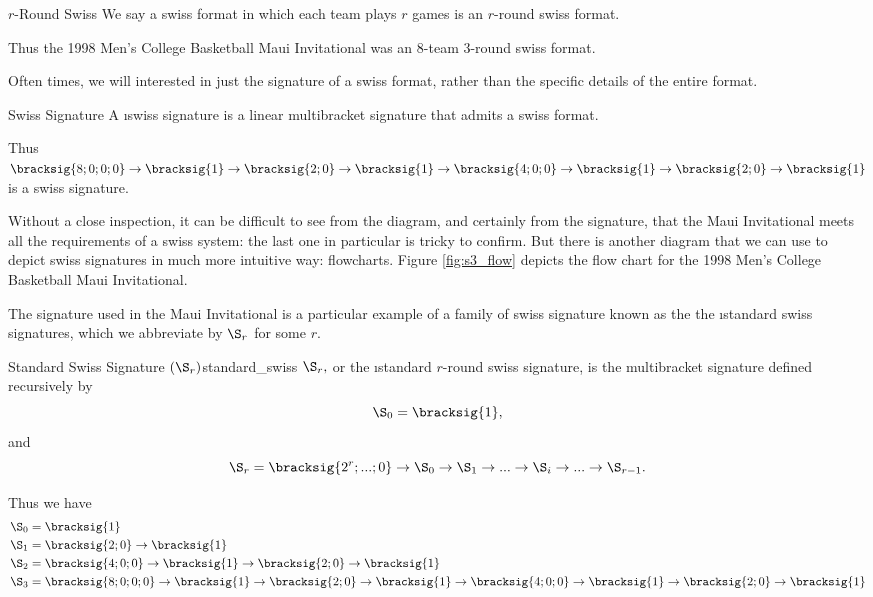 {    \begin{definition}{$r$-Round Swiss}{}
        We say a swiss format in which each team plays $r$ games is an $r$-round swiss format.
    \end{definition}

    Thus the 1998 Men's College Basketball Maui Invitational was an 8-team 3-round swiss format.

    Often times, we will interested in just the signature of a swiss format, rather than the specific details of the entire format.

    \begin{definition}{Swiss Signature}{}
        A \i{swiss signature} is a linear multibracket signature that admits a swiss format.
    \end{definition}

    Thus $\bracksig{8;0;0;0} \to \bracksig{1} \to \bracksig{2;0} \to \bracksig{1} \to \bracksig{4;0;0} \to \bracksig{1} \to \bracksig{2;0} \to \bracksig{1}$ is a swiss signature.

    Without a close inspection, it can be difficult to see from the diagram, and certainly from the signature, that the Maui Invitational meets all the requirements of a swiss system: the last one in particular is tricky to confirm. But there is another diagram that we can use to depict swiss signatures in much more intuitive way: flowcharts. Figure \ref{fig:s3_flow} depicts the flow chart for the 1998 Men's College Basketball Maui Invitational. %



    The signature used in the Maui Invitational is a particular example of a family of swiss signature known as the the \i{standard swiss signatures}, which we abbreviate by $\S_r$ for some $r$.

    \begin{definition}{Standard Swiss Signature $(\S_r)$}{standard_swiss}
        $\S_r,$ or the \i{standard $r$-round swiss signature}, is the multibracket signature defined recursively by $$\S_0 = \bracksig{1},$$ and
        $$\S_r = \bracksig{2^r; ...; 0} \to \S_{0} \to \S_1 \to ... \to \S_i \to ... \to \S_{r-1}.$$
    \end{definition}

    Thus we have
    \begin{align*}
        \S_0 =\; &\bracksig{1}\\
        \S_1 =\; &\bracksig{2;0} \to \bracksig{1}\\
        \S_2 =\; &\bracksig{4;0;0} \to \bracksig{1} \to \bracksig{2;0} \to \bracksig{1}\\
        \S_3 =\; &\bracksig{8;0;0;0} \to \bracksig{1} \to \bracksig{2;0} \to \bracksig{1} \to \bracksig{4;0;0} \to \bracksig{1} \to \bracksig{2;0} \to \bracksig{1}
    \end{align*}

}
